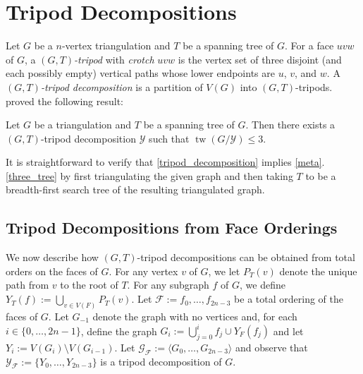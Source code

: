 \documentclass{patmorin}
\DeclareMathOperator{\tw}{tw}
\begin{document}
\section{Tripod Decompositions}

Let $G$ be a $n$-vertex triangulation and $T$ be a spanning tree of $G$. For a face $uvw$ of $G$, a \emph{$(G,T)$-tripod} with \emph{crotch} $uvw$ is the vertex set of three disjoint (and each possibly empty) vertical paths whose lower endpoints are $u$, $v$, and $w$.  A \emph{$(G,T)$-tripod decomposition} is a partition of $V(G)$ into $(G,T)$-tripods.  \citet{dujmovic.joret.ea:planar} proved the following result:

\begin{thm}\label{tripod_decomposition}
  Let $G$ be a triangulation and $T$ be a spanning tree of $G$.  Then there exists a $(G,T)$-tripod decomposition $\mathcal{Y}$ such that $\tw(G/\mathcal{Y})\le 3$.
\end{thm}

It is straightforward to verify that \cref{tripod_decomposition} implies \cref{meta}.\ref{three_tree} by first triangulating the given graph and then taking $T$ to be a breadth-first search tree of the resulting triangulated graph.


\subsection{Tripod Decompositions from Face Orderings}

We now describe how $(G,T)$-tripod decompositions can be obtained from total orders on the faces of $G$.  For any vertex $v$ of $G$, we let $P_T(v)$ denote the unique path from $v$ to the root of $T$.  For any subgraph $f$ of $G$, we define $Y_T(f):=\bigcup_{v\in V(F)} P_T(v)$.  Let $\mathcal{F}:=f_0,\ldots,f_{2n-3}$ be a total ordering of the faces of $G$. Let $G_{-1}$ denote the graph with no vertices and, for each $i\in\{0,\ldots,2n-1\}$, define the graph $G_i:=\bigcup_{j=0}^i f_j\cup Y_F(f_j)$ and let $Y_i:=V(G_i)\setminus V(G_{i-1})$.
Let $\mathcal{G_F}:=\langle G_0,\ldots,G_{2n-3}\rangle$ and
observe that $\mathcal{Y_F}:=\{Y_0,\ldots,Y_{2n-3}\}$ is a tripod decomposition of $G$.
\end{document}
